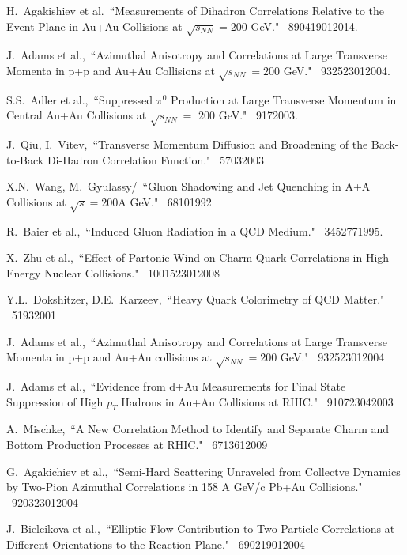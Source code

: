 \begin{thebibliography}{1000}
H.~Agakishiev et al.~``Measurements of Dihadron Correlations Relative to the Event Plane in Au+Au Collisions at $\sqrt{s_{NN}} = 200$ GeV." \Journal{\PRC} {~89}{041901}{2014}.

J.~Adams et al.,~``Azimuthal Anisotropy and Correlations at Large Transverse Momenta in p+p and Au+Au Collisions at $\sqrt{s_{NN}} = 200$ GeV." \Journal{\PRL} {~93}{252301}{2004}.

S.S.~Adler et al.,~``Suppressed $\pi^0$ Production at Large Transverse Momentum in Central Au+Au Collisions at $\sqrt{s_{NN}} = $ 200 GeV." \Journal{\PRL} {~91}{7}{2003}.

J.~Qiu, I.~Vitev,~``Transverse Momentum Diffusion and Broadening of the Back-to-Back Di-Hadron Correlation Function." \Journal{\PLB} {~570}{3}{2003}

X.N.~Wang, M.~Gyulassy/~``Gluon Shadowing and Jet Quenching in A+A Collisions at $\sqrt{s} = 200$A GeV." \Journal{\PRL} {~68}{10}{1992}

R.~Baier et al.,~``Induced Gluon Radiation in a QCD Medium." \Journal{\PLB} {~345}{277}{1995}.

X.~Zhu et al.,~``Effect of Partonic Wind on Charm Quark Correlations in High-Energy Nuclear Collisions." \Journal{\PRL} {~100}{152301}{2008}

Y.L.~Dokshitzer, D.E.~Karzeev,~``Heavy Quark Colorimetry of QCD Matter." \Journal{\PLB} {~519}{3}{2001}

J.~Adams et al.,~``Azimuthal Anisotropy and Correlations at Large Transverse Momenta in p+p and Au+Au collisions at $\sqrt{s_{NN}} = 200$ GeV." \Journal{\PRL} {~93}{252301}{2004}

J.~Adams et al.,~``Evidence from d+Au Measurements for Final State Suppression of High $p_T$ Hadrons in Au+Au Collisions at RHIC." \Journal{\PRL} {~91}{072304}{2003}

A.~Mischke,~``A New Correlation Method to Identify and Separate Charm and Bottom Production Processes at RHIC." \Journal{\PLB} {~671}{361}{2009}

G.~Agakichiev et al.,~``Semi-Hard Scattering Unraveled from Collectve Dynamics by Two-Pion Azimuthal Correlations in 158 A GeV/c Pb+Au Collisions." \Journal{\PRL} {~92}{032301}{2004}

J.~Bielcikova et al.,~``Elliptic Flow Contribution to Two-Particle Correlations at Different Orientations to the Reaction Plane." \Journal{\PRC} {~69}{021901}{2004}


\end{thebibliography}
